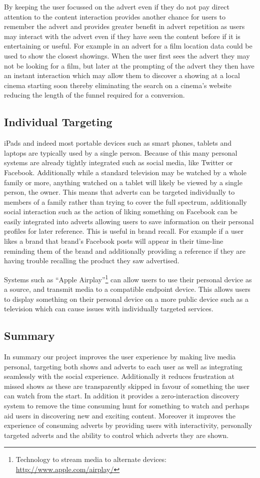 By keeping the user focussed on the advert even if they do not pay direct attention to the content interaction provides another chance for users to remember the advert and provides greater benefit in advert repetition as users may interact with the advert even if they have seen the content before if it is entertaining or useful. For example in an advert for a film location data could be used to show the closest showings. When the user first sees the advert they may not be looking for a film, but later at the prompting of the advert they then have an instant interaction which may allow them to discover a showing at a local cinema starting soon thereby eliminating the search on a cinema's website reducing the length of the funnel required for a conversion.

\subsection{Individual Targeting}
iPads and indeed most portable devices such as smart phones, tablets and laptops are typically used by a single person. Because of this many personal systems are already tightly integrated such as social media, like Twitter or Facebook. Additionally while a standard television may be watched by a whole family or more, anything watched on a tablet will likely be viewed by a single person, the owner. This means that adverts can be targeted individually to members of a family rather than trying to cover the full spectrum, additionally social interaction such as the action of liking something on Facebook can be easily integrated into adverts allowing users to save information on their personal profiles for later reference. This is useful in brand recall. For example if a user likes a brand that brand's Facebook posts will appear in their time-line reminding them of the brand and additionally providing a reference if they are having trouble recalling the product they saw advertised.

Systems such as ``Apple Airplay''\footnote{Technology to stream media to alternate devices: \url{http://www.apple.com/airplay/}} can allow users to use their personal device as a source, and transmit media to a compatible endpoint device. This allows users to display something on their personal device on a more public device such as a television which can cause issues with individually targeted services.

\subsection{Summary}
In summary our project improves the user experience by making live media personal, targeting both shows and adverts to each user as well as integrating seamlessly with the social experience. Additionally it reduces frustration at missed shows as these are transparently skipped in favour of something the user can watch from the start. In addition it provides a zero-interaction discovery system to remove the time consuming hunt for something to watch and perhaps aid users in discovering new and exciting content. Moreover it improves the experience of consuming adverts by providing users with interactivity, personally targeted adverts and the ability to control which adverts they are shown. 
